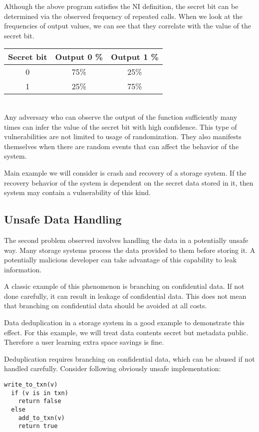 Although the above program satisfies the NI definition, the secret bit can be determined via the observed frequency of repeated calls. When we look at the frequencies of output values, we can see that they correlate with the value of the secret bit.\\

\begin{tabular}{| c | c | c |}
	\hline
	Secret bit & Output 0 \% & Output 1 \% \\
	\hline
	0 &	75\% & 25\% \\
	\hline
	1 &	25\% & 75\% \\
	\hline
\end{tabular}\\

Any adversary who can observe the output of the function sufficiently many times can infer the value of the secret bit with high confidence. This type of vulnerabilities are not limited to usage of randomization. They also manifests themselves when there are random events that can affect the behavior of the system. 

Main example we will consider is crash and recovery of a storage system. If the recovery behavior of the system is dependent on the secret data stored in it, then system may contain a vulnerability of this kind. 

\subsection{Unsafe Data Handling}
The second problem observed involves handling the data in a potentially unsafe way. Many storage systems process the data provided to them before storing it. A potentially malicious developer can take advantage of this capability to leak information.

A classic example of this phenomenon is branching on confidential data. If not done carefully, it can result in leakage of confidential data. This does not mean that branching on confidential data should be avoided at all costs.

Data deduplication in a storage system in a good example to demonstrate this effect. For this example, we will treat data contents secret but metadata public. Therefore a user learning extra space savings is fine.

Deduplication requires branching on confidential data, which can be abused if not handled carefully. Consider following obviously unsafe implementation:

\begin{lstlisting}
write_to_txn(v)
  if (v is in txn)
    return false
  else
    add_to_txn(v)
    return true
\end{lstlisting}

